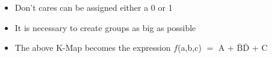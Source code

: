 \begin{itemize}
\begin{itemize}
    \end{itemize}

  \item Don't cares can be assigned either a 0 or 1

  \item It is necessary to create groups as big as possible

  \item The above K-Map becomes the expression $f$(a,b,c) $=$ A + $\bar{\text{B}}\bar{\text{D}}$ + C

\end{itemize}




